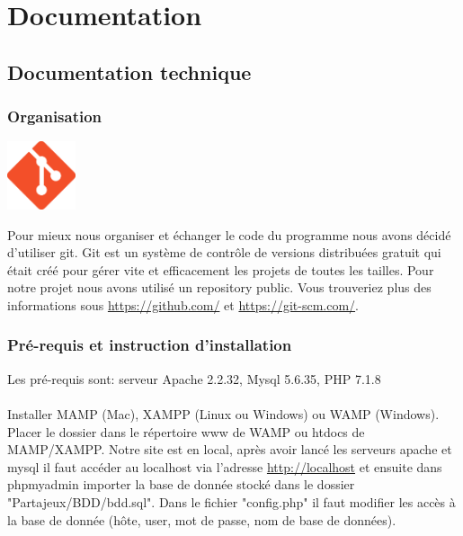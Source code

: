 \documentclass[a4paper,12pt,abstracton,titlepage]{scrartcl}
\begin{document}
\newpage
\section{Documentation}
\subsection{Documentation technique}
\subsubsection{Organisation}
\begin{floatingfigure}[r]{0.25\textwidth}
\includegraphics[width=0.15\textwidth]{./doc/git_logo.png}
\label{git}
\end{floatingfigure}

Pour mieux nous organiser et échanger le code du programme nous avons décidé d'utiliser git. Git est un système de contrôle de versions distribuées gratuit qui était créé pour gérer vite et efficacement les projets de toutes les tailles. Pour notre projet nous avons utilisé un repository public.
Vous trouveriez plus des informations sous \url{https://github.com/} et \url{https://git-scm.com/}.\\

\subsubsection{Pré-requis et instruction d'installation}
Les pré-requis sont:  serveur Apache 2.2.32, Mysql 5.6.35, PHP 7.1.8\\
\\
Installer MAMP (Mac), XAMPP (Linux ou Windows) ou WAMP (Windows).
Placer le dossier dans le répertoire www de WAMP ou htdocs de MAMP/XAMPP.
Notre site est en local, après avoir lancé les serveurs apache et mysql il faut accéder au localhost via l'adresse \url{http://localhost} et ensuite dans phpmyadmin importer la base de donnée stocké dans le dossier "Partajeux/BDD/bdd.sql".
Dans le fichier "config.php" il faut modifier les accès à la base de donnée (hôte, user, mot de passe, nom de base de données).
\end{document}
